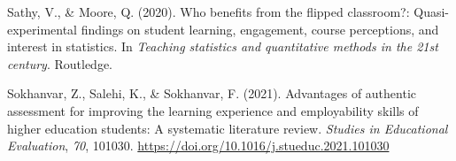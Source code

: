 \documentclass[
  11pt,
  letterpaper,
  oneside,
  open=any]{scrbook}
\newlength{\cslhangindent}
\newlength{\cslentryspacingunit} %
\newenvironment{CSLReferences}[2] %
 {%
  \setlength{\parindent}{0pt}
  \ifodd #1
  \let\oldpar\par
  \def\par{\hangindent=\cslhangindent\oldpar}
  \fi
  \setlength{\parskip}{#2\cslentryspacingunit}
 }%
 {}
\begin{document}
\begin{CSLReferences}{1}{0}
\leavevmode{}%
Sathy, V., \& Moore, Q. (2020). Who benefits from the flipped
classroom?: Quasi-experimental findings on student learning, engagement,
course perceptions, and interest in statistics. In \emph{Teaching
statistics and quantitative methods in the 21st century}. Routledge.

\leavevmode{}%
Sokhanvar, Z., Salehi, K., \& Sokhanvar, F. (2021). Advantages of
authentic assessment for improving the learning experience and
employability skills of higher education students: A systematic
literature review. \emph{Studies in Educational Evaluation}, \emph{70},
101030. \url{https://doi.org/10.1016/j.stueduc.2021.101030}

\end{CSLReferences}


\backmatter
\end{document}
